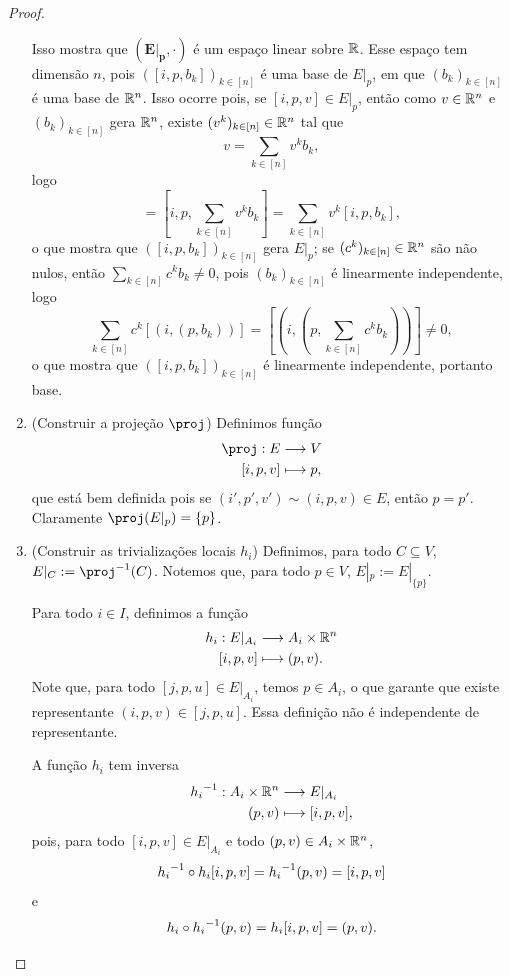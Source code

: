 \begin{proof}
\begin{enumerate}
Isso mostra que $(\bm{E|_p},\cdot)$ é um espaço linear sobre $\mathbb{R}$. Esse espaço tem dimensão $n$, pois $([i,p,b_k])_{k \in [n]}$ é uma base de $E|_p$, em que $(b_k)_{k \in [n]}$ é uma base de $\mathbb{R}^n$. Isso ocorre pois, se $[i,p,v] \in E|_p$, então como $v \in \mathbb{R}^n$ e $(b_k)_{k \in [n]}$ gera $\mathbb{R}^n$, existe $(v^k)_{k \in [n]} \in \mathbb{R}^n$ tal que
	\begin{equation*}
	v = \sum_{k \in [n]} v^k b_k,
	\end{equation*}
logo
	\begin{equation*}
	[i,p,v] = [i,p,\sum_{k \in [n]} v^k b_k] = \sum_{k \in [n]} v^k [i,p,b_k],
	\end{equation*}
o que mostra que $([i,p,b_k])_{k \in [n]}$ gera $E|_p$; se $(c^k)_{k \in [n]} \in \mathbb{R}^n$ são não nulos, então $\sum_{k \in [n]} c^k b_k \neq 0$, pois $(b_k)_{k \in [n]}$ é linearmente independente, logo
	\begin{equation*}
	\sum_{k \in [n]} c^k [(i,(p,b_k))] = [(i,(p,\sum_{k \in [n]} c^k b_k))] \neq 0,
	\end{equation*}
o que mostra que $([i,p,b_k])_{k \in [n]}$ é linearmente independente, portanto base.

\item (Construir a projeção $\proj$) Definimos função
	\begin{align*}
	\func{\proj}{E}{V}{[i,p,v]}{p},
	\end{align*}
que está bem definida pois se $(i',p',v') \sim (i,p,v) \in E$, então $p=p'$.
Claramente $\proj(E|_p) = \{p\}$.

\item (Construir as trivializações locais $h_i$) Definimos, para todo $C \subseteq V$, $E|_C := \proj\inv(C)$. Notemos que, para todo $p \in V$, $E|_p := E|_{\{p\}}$.

Para todo $i \in I$, definimos a função
	\begin{align*}
	{h_i}: {E|_{A_i}} &\longrightarrow {A_i \times \mathbb{R}^n} \\{[i,p,v]} &\longmapsto {(p,v)}.
	\end{align*}
Note que, para todo $[j,p,u] \in E|_{A_i}$, temos $p \in A_i$, o que garante que existe representante $(i,p,v) \in [j,p,u]$. Essa definição não é independente de representante.

A função $h_i$ tem inversa
	\begin{align*}
	{{h_i}^{-1}}: {A_i \times \mathbb{R}^n} &\longrightarrow {E|_{A_i}} \\{(p,v)} &\longmapsto {[i,p,v]},
	\end{align*}
pois, para todo $[i,p,v] \in E|_{A_i}$ e todo $(p,v) \in A_i \times \mathbb{R}^n$,
	\begin{equation*}
	{h_i}^{-1} \circ h_i [i,p,v] = {h_i}^{-1} (p,v) = [i,p,v]
	\end{equation*}
e
	\begin{equation*}
	h_i \circ {h_i}^{-1} (p,v) = h_i [i,p,v] = (p,v).
	\end{equation*}


\end{enumerate}
\end{proof}
